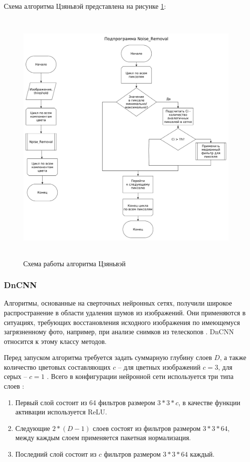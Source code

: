 Схема алгоритма Цзяньвэй представлена на рисунке \ref{fig::china}:
\FloatBarrier
\begin{figure}[h]	
	\begin{center}
		\includegraphics[height=13cm]{inc/pdf/china.pdf}
	\end{center}
	\captionsetup{justification=centering}
	\caption{Схема работы алгоритма Цзяньвэй}
	\label{fig::china}
\end{figure}
\FloatBarrier

\subsubsection{DnCNN}
Алгоритмы, основанные на сверточных нейронных сетях, получили широкое распространение в области удаления шумов из изображений.
Они применяются в ситуациях, требующих восстановления исходного изображения по имеющемуся загрязненному фото, например, при анализе снимков из телескопов \cite{neural}. 
DnCNN относится к этому классу методов.

Перед запуском алгоритма требуется задать суммарную глубину слоев $D$, а также количество цветовых составляющих $c$ -- для цветных изображений $c=3$, для серых -- $c=1$ \cite{dcnn}. Всего в конфигурации нейронной сети используется три типа слоев \cite{dcnn2}:
\begin{enumerate}
	\item Первый слой состоит из 64 фильтров размером $3*3*c$, в качестве функции активации используется ReLU.
	\item Следующие $2*(D - 1)$ слоев состоят из фильтров размером $3*3*64$, между каждым слоем применяется пакетная нормализация.
	\item Последний слой состоит из $c$ фильтров размером $3*3*64$ каждый.
\end{enumerate}

